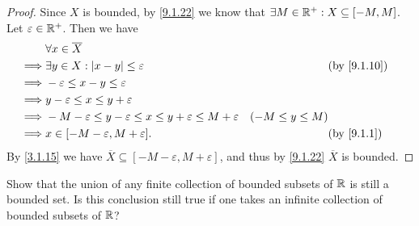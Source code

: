 \begin{proof}
	Since \(X\) is bounded, by \cref{9.1.22} we know that \(\exists M \in \mathbb{R}^+ : X \subseteq [-M, M]\).
	Let \(\varepsilon \in \mathbb{R}^+\).
	Then we have
	\begin{align*}
		         & \forall x \in \overline{X}                                                                                                \\
		\implies & \exists y \in X : \abs{x - y} \leq \varepsilon                                         &                    & \by{9.1.10} \\
		\implies & -\varepsilon \leq x - y \leq \varepsilon                                                                                  \\
		\implies & y - \varepsilon \leq x \leq y + \varepsilon                                                                               \\
		\implies & -M - \varepsilon \leq y - \varepsilon \leq x \leq y + \varepsilon \leq M + \varepsilon & (-M \leq y \leq M)               \\
		\implies & x \in [-M - \varepsilon, M + \varepsilon].                                             &                    & \by{9.1.1}
	\end{align*}
	By \cref{3.1.15} we have \(\overline{X} \subseteq [-M - \varepsilon, M + \varepsilon]\), and thus by \cref{9.1.22} \(\overline{X}\) is bounded.
\end{proof}

\begin{ex}\label{ex:9.1.12}
	Show that the union of any finite collection of bounded subsets of \(\mathbb{R}\) is still a bounded set.
	Is this conclusion still true if one takes an infinite collection of bounded subsets of \(\mathbb{R}\)?
\end{ex}

